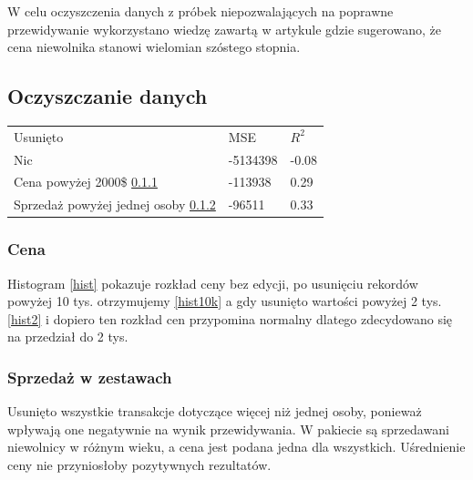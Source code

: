 \documentclass[a4paper,12pt]{article}
\begin{document}
	W celu oczyszczenia danych z próbek niepozwalających na poprawne przewidywanie wykorzystano wiedzę zawartą w artykule\cite{slave_article} gdzie sugerowano, że cena niewolnika stanowi wielomian szóstego stopnia.
	
	\subsection{Oczyszczanie danych}
		\begin{tabular}{lll}
			Usunięto	&	MSE		&	$R^2$\\
			Nic			&	-5134398	&	-0.08\\
			Cena powyżej 2000\$ \ref{price}	&	-113938	&	0.29\\
			Sprzedaż powyżej jednej osoby \ref{wiecej_niz_jeden}
			&	-96511	&	0.33\\		
			
		\end{tabular}
	
		\subsubsection{Cena}
		\label{price}
		Histogram \ref{hist} pokazuje rozkład ceny bez edycji, po usunięciu rekordów powyżej 10 tys. otrzymujemy \ref{hist10k} a gdy usunięto wartości powyżej 2 tys. \ref{hist2} i dopiero ten rozkład cen przypomina normalny dlatego zdecydowano się na przedział do 2 tys.
		
		\subsubsection{Sprzedaż w zestawach}
		\label{wiecej_niz_jeden}
			Usunięto wszystkie transakcje dotyczące więcej niż jednej osoby, ponieważ wpływają one negatywnie na wynik przewidywania. W pakiecie są sprzedawani niewolnicy w różnym wieku, a cena jest podana jedna dla wszystkich. Uśrednienie ceny nie przyniosłoby pozytywnych rezultatów.
		
\end{document}
